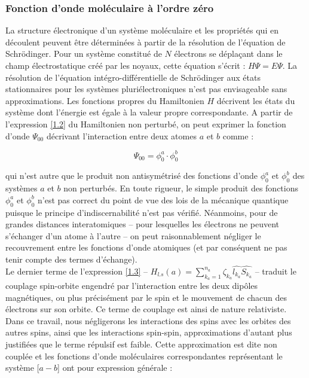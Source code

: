 		
	
	\subsubsection{Fonction d'onde moléculaire à l'ordre zéro}
	
	La structure électronique d'un système moléculaire et les propriétés qui en découlent peuvent être déterminées à partir de la résolution de l'équation de Schr\"{o}dinger. Pour un système constitué de $N$ électrons se déplaçant dans le champ électrostatique créé par les noyaux, cette équation s'écrit : $H\Psi = E\Psi$. La résolution de l'équation intégro-différentielle de Schr\"{o}dinger aux états stationnaires pour les systèmes pluriélectroniques n'est pas envisageable sans approximations. Les fonctions propres du Hamiltonien $H$ décrivent les états du système dont l'énergie est égale à la valeur propre correspondante. A partir de l'expression \ref{1.2} du Hamiltonien non perturbé, on peut exprimer la fonction d'onde $\Psi_{00}$ décrivant l'interaction entre deux atomes $a$ et $b$ comme : 
	
	\begin{equation}
	\Psi_{00} = \phi_{0}^{a} \cdot \phi_{0}^{b}
	\end{equation}
	
	\noindent qui n'est autre que le produit non antisymétrisé des fonctions d'onde $\phi_{0}^{a}$ et $\phi_{0}^{b}$ des systèmes $a$ et $b$ non perturbés. En toute rigueur, le simple produit des fonctions $\phi_{0}^{a}$ et $\phi_{0}^{b}$ n'est pas correct du point de vue des lois de la mécanique quantique puisque le principe d'indiscernabilité n'est pas vérifié. Néanmoins, pour de grandes distances interatomiques -- pour lesquelles les électrons ne peuvent s'échanger d'un atome à l'autre -- on peut raisonnablement négliger le recouvrement entre les fonctions d'onde atomiques (et par conséquent ne pas tenir compte des termes d'échange).\\
	
	Le dernier terme de l'expression \ref{1.3} -- $H_{l.s}(a) = \sum_{k_{a}=1}^{n_{a}} \zeta_{k_{a}} \widehat{l_{k_{a}}} \widehat{S_{k_{a}}}$ -- traduit le couplage spin-orbite engendré par l'interaction entre les deux dipôles magnétiques, ou plus précisément par le spin et le mouvement de chacun des électrons sur son orbite. Ce terme de couplage est ainsi de nature relativiste. Dans ce travail, nous négligerons les interactions des spins avec les orbites des autres spins, ainsi que les interactions spin-spin, approximations d'autant plus justifiées que le terme répulsif est faible. Cette approximation est dite \og non couplée \fg{} \cite{fontana1961theory,fontana1962theory} et les fonctions d'onde moléculaires correspondantes représentant le système [$a-b$] ont pour expression générale : 
	
